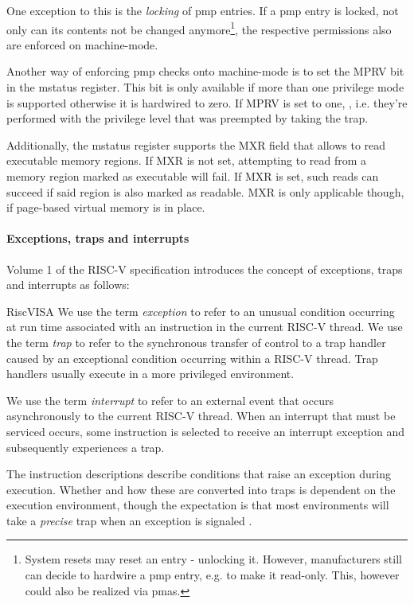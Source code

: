One exception to this is the \textit{locking} of \gls{pmp} entries.
If a \gls{pmp} entry is locked, not only can its contents not be changed anymore\footnote{%
    System resets may reset an entry - unlocking it.
    However, manufacturers still can decide to hardwire a \gls{pmp} entry, e.g. to make it read-only.
    This, however could also be realized via \glspl{pma}.
}, the respective permissions also are enforced on machine-mode.

Another way of enforcing \gls{pmp} checks onto machine-mode is to set the MPRV bit in the \gls{mstatus} register.
This bit is only available if more than one privilege mode is supported otherwise it is hardwired to zero.
If MPRV is set to one, , i.e. they're performed with the privilege level that was preempted by taking the trap.

Additionally, the \gls{mstatus} register supports the MXR field that allows to read executable memory regions.
If MXR is not set, attempting to read from a memory region marked as executable will fail.
If MXR is set, such reads can succeed if said region is also marked as readable.
MXR is only applicable though, if page-based virtual memory is in place.

\paragraph{Exceptions, traps and interrupts}

Volume 1 of the RISC-V specification \cite{RiscVISA} introduces the concept of exceptions, traps and interrupts as follows:
\begin{displaycquote}{RiscVISA}
    We use the term \textit{exception} to refer to an unusual condition occurring at run time associated with an instruction in the current RISC-V thread.
    We use the term \textit{trap} to refer to the synchronous transfer of control to a trap handler caused by an exceptional condition occurring within a RISC-V thread.
    Trap handlers usually execute in a more privileged environment.

    We use the term \textit{interrupt} to refer to an external event that occurs asynchronously to the current RISC-V thread.
    When an interrupt that must be serviced occurs, some instruction is selected to receive an interrupt exception and subsequently experiences a trap.

    The instruction descriptions \textelp{} describe conditions that raise an exception during execution.
    Whether and how these are converted into traps is dependent on the execution environment, though the expectation is that most environments will take a \textit{precise} trap when an exception is signaled \textelp{}.
\end{displaycquote}

